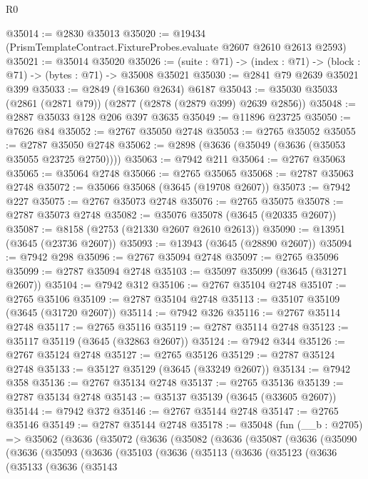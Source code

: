 \begin{lexlean}{R0}
\begin{coremodule}
@35014 := @2830 @35013
@35020 := @19434 (PrismTemplateContract.FixtureProbes.evaluate @2607 @2610 @2613 @2593)
@35021 := @35014 @35020
@35026 := (suite : @71) -> (index : @71) -> (block : @71) -> (bytes : @71) -> @35008 @35021
@35030 := @2841 @79 @2639 @35021 @399
@35033 := @2849 (@16360 @2634) @6187
@35043 := @35030 @35033 (@2861 (@2871 @79)) (@2877 (@2878 (@2879 @399) @2639 @2856))
@35048 := @2887 @35033 @128 @206 @397 @3635
@35049 := @11896 @23725
@35050 := @7626 @84
@35052 := @2767 @35050 @2748
@35053 := @2765 @35052
@35055 := @2787 @35050 @2748
@35062 := @2898 (@3636 (@35049 (@3636 (@35053 @35055 @23725 @2750))))
@35063 := @7942 @211
@35064 := @2767 @35063
@35065 := @35064 @2748
@35066 := @2765 @35065
@35068 := @2787 @35063 @2748
@35072 := @35066 @35068 (@3645 (@19708 @2607))
@35073 := @7942 @227
@35075 := @2767 @35073 @2748
@35076 := @2765 @35075
@35078 := @2787 @35073 @2748
@35082 := @35076 @35078 (@3645 (@20335 @2607))
@35087 := @8158 (@2753 (@21330 @2607 @2610 @2613))
@35090 := @13951 (@3645 (@23736 @2607))
@35093 := @13943 (@3645 (@28890 @2607))
@35094 := @7942 @298
@35096 := @2767 @35094 @2748
@35097 := @2765 @35096
@35099 := @2787 @35094 @2748
@35103 := @35097 @35099 (@3645 (@31271 @2607))
@35104 := @7942 @312
@35106 := @2767 @35104 @2748
@35107 := @2765 @35106
@35109 := @2787 @35104 @2748
@35113 := @35107 @35109 (@3645 (@31720 @2607))
@35114 := @7942 @326
@35116 := @2767 @35114 @2748
@35117 := @2765 @35116
@35119 := @2787 @35114 @2748
@35123 := @35117 @35119 (@3645 (@32863 @2607))
@35124 := @7942 @344
@35126 := @2767 @35124 @2748
@35127 := @2765 @35126
@35129 := @2787 @35124 @2748
@35133 := @35127 @35129 (@3645 (@33249 @2607))
@35134 := @7942 @358
@35136 := @2767 @35134 @2748
@35137 := @2765 @35136
@35139 := @2787 @35134 @2748
@35143 := @35137 @35139 (@3645 (@33605 @2607))
@35144 := @7942 @372
@35146 := @2767 @35144 @2748
@35147 := @2765 @35146
@35149 := @2787 @35144 @2748
@35178 := @35048
    (fun (__b : @2705) =>
    @35062
      (@3636
        (@35072
          (@3636
            (@35082
              (@3636
                (@35087
                  (@3636
                    (@35090
                      (@3636
                        (@35093
                          (@3636
                            (@35103
                              (@3636
                                (@35113
                                  (@3636
                                    (@35123
                                      (@3636
                                        (@35133
                                          (@3636
                                            (@35143

\end{coremodule}
\end{lexlean}
